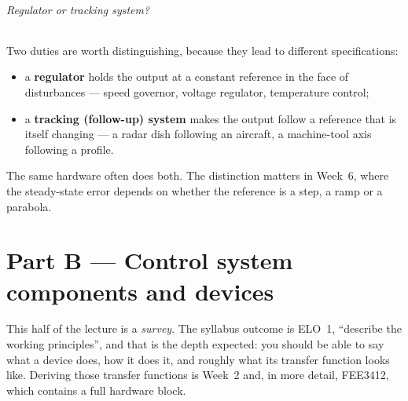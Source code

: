 \documentclass[11pt,a4paper]{article}
\begin{document}
\paragraph{Regulator or tracking system?} Two duties are worth distinguishing,
because they lead to different specifications:
\begin{itemize}[leftmargin=*]
\item a \textbf{regulator} holds the output at a constant reference in the face
      of disturbances --- speed governor, voltage regulator, temperature
      control;
\item a \textbf{tracking (follow-up) system} makes the output follow a
      reference that is itself changing --- a radar dish following an aircraft,
      a machine-tool axis following a profile.
\end{itemize}
The same hardware often does both. The distinction matters in Week~6, where the
steady-state error depends on whether the reference is a step, a ramp or a
parabola.

\part*{Part B --- Control system components and devices}

\noindent
This half of the lecture is a \emph{survey}. The syllabus outcome is ELO~1,
``describe the working principles'', and that is the depth expected: you should
be able to say what a device does, how it does it, and roughly what its
transfer function looks like. Deriving those transfer functions is Week~2 and,
in more detail, FEE3412, which contains a full hardware block.
\end{document}
